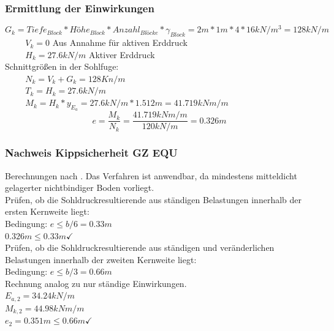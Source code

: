 \documentclass[11pt,fleqn,a4paper,halfparskip]{article}
\begin{document}
\subsubsection{Ermittlung der Einwirkungen}
\begin{equation*}
G_k = Tiefe_{Block} * Höhe_{Block} * Anzahl_{Blöcke} * \gamma_{Block} = 2m * 1m * 4 * 16kN/m^3 = 128kN/m
\end{equation*}
$\hspace{1cm} V_k = 0 $ Aus Annahme für aktiven Erddruck \\
$\hspace{1cm} H_k = 27.6kN/m $ Aktiver Erddruck \\
Schnittgrößen in der Sohlfuge: \\
$\hspace{1cm} N_k = V_k + G_k = 128Kn/m $\\
$\hspace{1cm} T_k = H_k = 27.6kN/m $ \\
$\hspace{1cm} M_k = H_k * y_{E_a} = 27.6kN/m * 1.512m = 41.719kNm/m $ \\
\begin{equation*}
e = \frac{M_k}{N_k} = \frac{41.719kNm/m}{120kN/m} = 0.326m
\end{equation*}
\subsubsection{Nachweis Kippsicherheit GZ EQU}
Berechnungen nach \cite[S.97]{wsp}. Das Verfahren ist anwendbar, da mindestens mitteldicht gelagerter nichtbindiger Boden vorliegt.\\ 
Prüfen, ob die Sohldruckresultierende aus ständigen Belastungen innerhalb der ersten Kernweite liegt: \\
Bedingung: $ e \le b/6 =0.33m$ \\
$ 0.326m \le 0.33m \checkmark$ \\
\newpage
Prüfen, ob die Sohldruckresultierende aus ständigen und veränderlichen Belastungen innerhalb der zweiten Kernweite liegt:\\
Bedingung: $e \le b/3 = 0.66m$\\
Rechnung analog zu nur ständige Einwirkungen.\\
$E_{a,2} = 34.24kN/m$ \\
$M_{k,2} = 44.98kNm/m$ \\
$e_2 = 0.351m \le 0.66m \checkmark$
\end{document}
